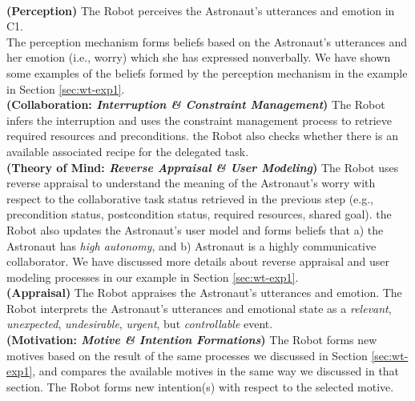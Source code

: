 \noindent{}\\

\noindent\textbf{(Perception)} The Robot perceives the Astronaut's utterances
and emotion in C1.\\

The perception mechanism forms beliefs based on the Astronaut's utterances and
her emotion (i.e., worry) which she has expressed nonverbally. We have shown
some examples of the beliefs formed by the perception mechanism in the example
in Section \ref{sec:wt-exp1}.\\

\noindent\textbf{(Collaboration: \textit{Interruption \& Constraint
Management})} The Robot infers the interruption and uses the constraint
management process to retrieve required resources and preconditions. the Robot
also checks whether there is an available associated recipe for the delegated
task.\\

\noindent\textbf{(Theory of Mind: \textit{Reverse Appraisal \& User Modeling})}
The Robot uses reverse appraisal to understand the meaning of the Astronaut's
worry with respect to the collaborative task status retrieved in the previous
step (e.g., precondition status, postcondition status, required resources,
shared goal). the Robot also updates the Astronaut's user model and forms
beliefs that a) the Astronaut has \textit{high autonomy}, and b) Astronaut is a
highly communicative collaborator. We have discussed more details about reverse
appraisal and user modeling processes in our example in Section
\ref{sec:wt-exp1}.\\

\noindent\textbf{(Appraisal)} The Robot appraises the Astronaut's utterances and
emotion. The Robot interprets the Astronaut's utterances and emotional state as
a \textit{relevant}, \textit{unexpected}, \textit{undesirable}, \textit{urgent},
but \textit{controllable} event.\\

\noindent\textbf{(Motivation: \textit{Motive \& Intention Formations})} The
Robot forms new motives based on the result of the same processes we discussed
in Section \ref{sec:wt-exp1}, and compares the available motives in the same way
we discussed in that section. The Robot forms new intention(s) with respect to
the selected motive.\\

